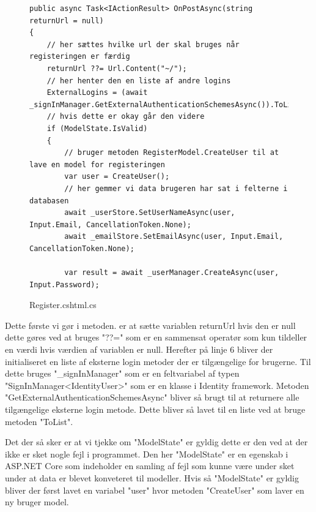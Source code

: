 \begin{figure}[!h]
    \begin{verbatim}
public async Task<IActionResult> OnPostAsync(string returnUrl = null)
{
    // her sættes hvilke url der skal bruges når registeringen er færdig
    returnUrl ??= Url.Content("~/");
    // her henter den en liste af andre logins
    ExternalLogins = (await _signInManager.GetExternalAuthenticationSchemesAsync()).ToList();
    // hvis dette er okay går den videre
    if (ModelState.IsValid)
    {
        // bruger metoden RegisterModel.CreateUser til at lave en model for registeringen
        var user = CreateUser();
        // her gemmer vi data brugeren har sat i felterne i databasen
        await _userStore.SetUserNameAsync(user, Input.Email, CancellationToken.None);
        await _emailStore.SetEmailAsync(user, Input.Email, CancellationToken.None);
        
        var result = await _userManager.CreateAsync(user, Input.Password);
\end{verbatim}
\caption{Register.cshtml.cs}\label{code:Register.cshtml.cs}
\end{figure}
Dette første vi gør i metoden. er at sætte variablen returnUrl hvis den er null dette gøres ved at bruges "??=" som er 
en sammensat operatør som kun tildeller en værdi hvis værdien af variablen er null. Herefter på linje 6 bliver der initialiseret en liste
af eksterne login metoder der er tilgængelige for brugerne. Til dette bruges "\_signInManager" som er en feltvariabel af typen "SignInManager<IdentityUser>"
som er en klasse i Identity framework. Metoden "GetExternalAuthenticationSchemesAsync" bliver så brugt til at returnere alle tilgængelige eksterne login metode. 
Dette bliver så lavet til en liste ved at bruge metoden "ToList". 

Det der så sker er at vi tjekke om "ModelState" er gyldig dette er den ved at der ikke er sket nogle fejl
i programmet. Den her "ModelState" er en egenskab i ASP.NET Core som indeholder en samling af fejl som 
kunne være under sket under at data er blevet konveteret til modeller. Hvis så "ModelState" er gyldig bliver der
først lavet en variabel "user" hvor metoden "CreateUser" som laver en ny bruger model. 

